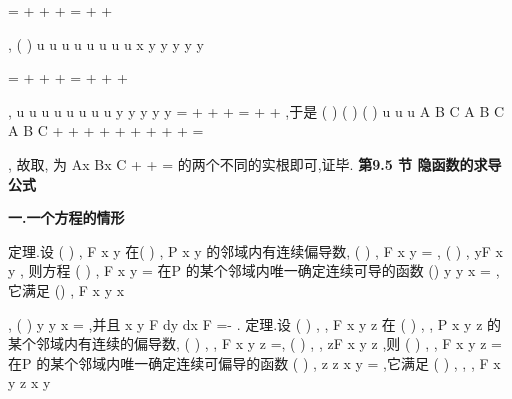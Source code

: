 \partial 
\partial 
\partial 
\partial 
\partial 
\partial 
\partial 
\partial 
\partial 
\partial 
\partial 
\partial 
=
+
+
+
=
+
+




\partial 
\partial 
\partial 
\partial \partial 
\partial 
\partial \partial \partial 
\partial 
\partial 
\partial 
\partial \partial 
\partial 




, 
(
)
u
u
u
u
u
u
u
u
x y
y
y
y
y
\psi 
\eta 
\psi 
\eta 
\lambda 
\mu 
\lambda 
\lambda 
\mu 
\mu 
\psi 
\psi \eta 
\eta \psi 
\eta 
\psi 
\psi \eta 
\eta 




\partial 
\partial 
\partial 
\partial 
\partial 
\partial 
\partial 
\partial 
\partial 
\partial 
\partial 
\partial 
=
+
+
+
=
+
+
+




\partial \partial 
\partial 
\partial 
\partial \partial 
\partial 
\partial \partial 
\partial 
\partial 
\partial 
\partial 
\partial \partial 
\partial 




, 
u
u
u
u
u
u
u
u
y
y
y
y
y
\psi 
\eta 
\psi 
\eta 
\psi 
\psi \eta 
\eta \psi 
\eta 
\psi 
\psi \eta 
\eta 
\partial 
\partial 
\partial 
\partial 
\partial 
\partial 
\partial 
\partial 
\partial 
\partial 
\partial 
\partial 
=
+
+
+
=
+
+
\partial 
\partial 
\partial 
\partial \partial 
\partial 
\partial \partial 
\partial 
\partial 
\partial 
\partial 
\partial \partial 
\partial 
,于是 
(
)
(
)
(
)
u
u
u
A
B
C
A
B
C
A
B
C
\lambda 
\lambda 
\lambda \mu 
\lambda 
\mu 
\mu 
\mu 
\psi 
\psi \eta 
\eta 
\partial 
\partial 
\partial 
+
+
+
+
+
+
+
+
+
=




\partial 
\partial \partial 
\partial 
, 
故取\lambda , \mu 为
Ax
Bx
C
+
+
=
的两个不同的实根即可,证毕. 
\vspace{6pt}
{\large \bfseries \textcolor{lyred}{第9.5 节 隐函数的求导公式}}

\vspace{4pt}
{\bfseries \textcolor{lyred}{一.一个方程的情形}}

\textcolor{lyred}{定理}.设
(
)
,
F x y 在(
)
,
P x
y
的邻域内有连续偏导数,
(
)
,
F x y
=
,
(
)
,
yF x y
\neq 
, 
则方程
(
)
,
F x y =
在P 的某个邻域内唯一确定连续可导的函数
()
y
y x
=
,它满足 
()
,
F x y x
\equiv 




,
(
)
y
y x
=
,并且
x
y
F
dy
dx
F
=-
. 
\textcolor{lyred}{定理}.设
(
)
, ,
F x y z 在
(
)
,
,
P x
y z
的某个邻域内有连续的偏导数,
(
)
,
,
F x y z
=, 
(
)
,
,
zF
x
y z
\neq 
,则
(
)
, ,
F x y z =
在P 的某个邻域内唯一确定连续可偏导的函数 
(
)
,
z
z x y
=
,它满足
(
)
, ,
,
F x y z x y
\equiv 




